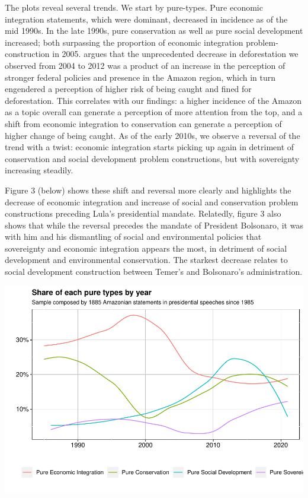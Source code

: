 \documentclass[]{interact}
\theoremstyle{plain}%
\theoremstyle{definition}
\theoremstyle{remark}
\begin{document}
The plots reveal several trends. We start by pure-types. Pure economic
integration statements, which were dominant, decreased in incidence as
of the mid 1990s. In the late 1990s, pure conservation as well as pure
social development increased; both surpassing the proportion of economic
integration problem-construction in 2005. \citet{capobianco2021} argues
that the unprecedented decrease in deforestation we observed from 2004
to 2012 was a product of an increase in the perception of stronger
federal policies and presence in the Amazon region, which in turn
engendered a perception of higher risk of being caught and fined for
deforestation. This correlates with our findings: a higher incidence of
the Amazon as a topic overall can generate a perception of more
attention from the top, and a shift from economic integration to
conservation can generate a perception of higher change of being caught.
As of the early 2010s, we observe a reversal of the trend with a twist:
economic integration starts picking up again in detriment of
conservation and social development problem constructions, but with
sovereignty increasing steadily.

Figure 3 (below) shows these shift and reversal more clearly and
highlights the decrease of economic integration and increase of social
and conservation problem constructions preceding Lula's presidential
mandate. Relatedly, figure 3 also shows that while the reversal precedes
the mandate of President Bolsonaro, it was with him and his dismantling
of social and environmental policies that sovereignty and economic
integration appears the most, in detriment of social development and
environmental conservation. The starkest decrease relates to social
development construction between Temer's and Bolsonaro's administration.

\includegraphics[width=0.9\linewidth]{rticle_files/figure-latex/Figure 3: pure types in time -1}
\end{document}
